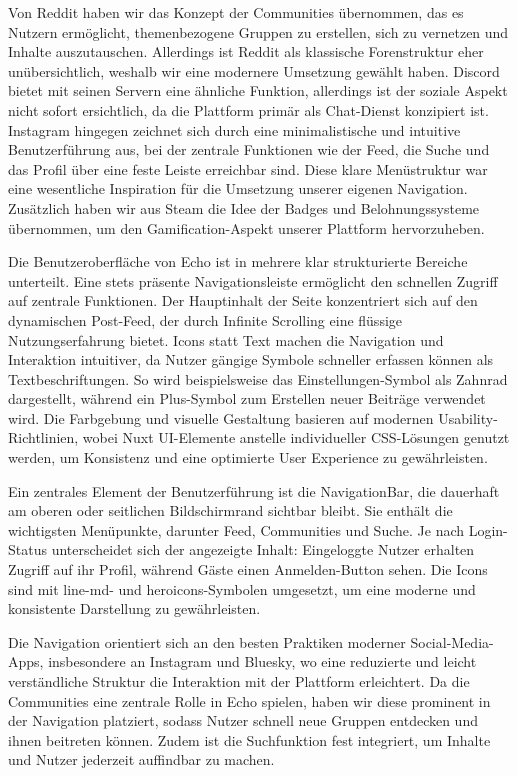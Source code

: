 \documentclass[a4paper,12pt]{article}
\begin{document}
Von Reddit haben wir das Konzept der Communities übernommen, das es Nutzern
ermöglicht, themenbezogene Gruppen zu erstellen, sich zu vernetzen und Inhalte
auszutauschen. Allerdings ist Reddit als klassische Forenstruktur eher
unübersichtlich, weshalb wir eine modernere Umsetzung gewählt haben. Discord
bietet mit seinen Servern eine ähnliche Funktion, allerdings ist der soziale
Aspekt nicht sofort ersichtlich, da die Plattform primär als Chat-Dienst
konzipiert ist. Instagram hingegen zeichnet sich durch eine minimalistische und
intuitive Benutzerführung aus, bei der zentrale Funktionen wie der Feed, die
Suche und das Profil über eine feste Leiste erreichbar sind. Diese klare
Menüstruktur war eine wesentliche Inspiration für die Umsetzung unserer eigenen
Navigation. Zusätzlich haben wir aus Steam die Idee der Badges und
Belohnungssysteme übernommen, um den Gamification-Aspekt unserer Plattform
hervorzuheben.

Die Benutzeroberfläche von Echo ist in mehrere klar strukturierte Bereiche
unterteilt. Eine stets präsente Navigationsleiste ermöglicht den schnellen
Zugriff auf zentrale Funktionen. Der Hauptinhalt der Seite konzentriert sich
auf den dynamischen Post-Feed, der durch Infinite Scrolling eine flüssige
Nutzungserfahrung bietet. Icons statt Text machen die Navigation und
Interaktion intuitiver, da Nutzer gängige Symbole schneller erfassen können als
Textbeschriftungen. So wird beispielsweise das Einstellungen-Symbol als Zahnrad
dargestellt, während ein Plus-Symbol zum Erstellen neuer Beiträge verwendet
wird. Die Farbgebung und visuelle Gestaltung basieren auf modernen
Usability-Richtlinien, wobei Nuxt UI-Elemente anstelle individueller
CSS-Lösungen genutzt werden, um Konsistenz und eine optimierte User Experience
zu gewährleisten.

Ein zentrales Element der Benutzerführung ist die NavigationBar, die dauerhaft
am oberen oder seitlichen Bildschirmrand sichtbar bleibt. Sie enthält die
wichtigsten Menüpunkte, darunter Feed, Communities und Suche. Je nach
Login-Status unterscheidet sich der angezeigte Inhalt: Eingeloggte Nutzer
erhalten Zugriff auf ihr Profil, während Gäste einen Anmelden-Button sehen. Die
Icons sind mit line-md- und heroicons-Symbolen umgesetzt, um eine moderne und
konsistente Darstellung zu gewährleisten.

Die Navigation orientiert sich an den besten Praktiken moderner
Social-Media-Apps, insbesondere an Instagram und Bluesky, wo eine reduzierte
und leicht verständliche Struktur die Interaktion mit der Plattform
erleichtert. Da die Communities eine zentrale Rolle in Echo spielen, haben wir
diese prominent in der Navigation platziert, sodass Nutzer schnell neue Gruppen
entdecken und ihnen beitreten können. Zudem ist die Suchfunktion fest
integriert, um Inhalte und Nutzer jederzeit auffindbar zu machen.
\end{document}
